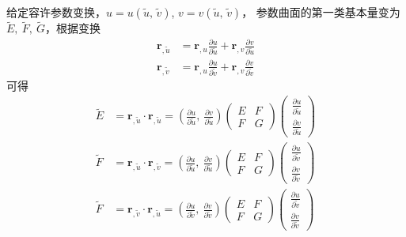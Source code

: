 给定容许参数变换，$u=u(\tilde{u},\, \tilde{v})$, $v=v(\tilde{u},\, \tilde{v})$，
参数曲面的第一类基本量变为$\tilde{E},\ \tilde{F},\ \tilde{G}$，根据变换
\begin{equation}\label{eq:transform}
    \begin{aligned}
        \mathbf{r}_{,\tilde{u}} &= \mathbf{r}_{,u}\frac{\partial u}{\partial \tilde{u}} + \mathbf{r}_{,v}\frac{\partial v}{\partial \tilde{u}} \\
        \mathbf{r}_{,\tilde{v}} &= \mathbf{r}_{,u}\frac{\partial u}{\partial \tilde{v}} + \mathbf{r}_{,v}\frac{\partial v}{\partial \tilde{v}}
    \end{aligned}
\end{equation}
可得
\begin{equation}
    \begin{aligned}
        \tilde{E} &= \mathbf{r}_{,\tilde{u}}\cdot\mathbf{r}_{,\tilde{u}} = 
        \left(\frac{\partial u}{\partial \tilde{u}},\ \frac{\partial v}{\partial \tilde{u}}\right) \left(\begin{array}{cc}
        E & F \\ F & G
        \end{array}\right)\left(\begin{array}{c}
        \frac{\partial u}{\partial \tilde{u}} \\ \frac{\partial v}{\partial \tilde{u}}
    \end{array}\right) \\
        \tilde{F} &= \mathbf{r}_{,\tilde{u}}\cdot\mathbf{r}_{,\tilde{v}} = 
        \left(\frac{\partial u}{\partial \tilde{u}},\ \frac{\partial v}{\partial \tilde{u}}\right) \left(\begin{array}{cc}
        E & F \\ F & G
        \end{array}\right)\left(\begin{array}{c}
        \frac{\partial u}{\partial \tilde{v}} \\ \frac{\partial v}{\partial \tilde{v}}
    \end{array}\right) \\
        \tilde{F} &= \mathbf{r}_{,\tilde{v}}\cdot\mathbf{r}_{,\tilde{u}} = 
        \left(\frac{\partial u}{\partial \tilde{v}},\ \frac{\partial v}{\partial \tilde{v}}\right) \left(\begin{array}{cc}
        E & F \\ F & G
        \end{array}\right)\left(\begin{array}{c}
        \frac{\partial u}{\partial \tilde{v}} \\ \frac{\partial v}{\partial \tilde{v}}
    \end{array}\right)
    \end{aligned}
\end{equation}
